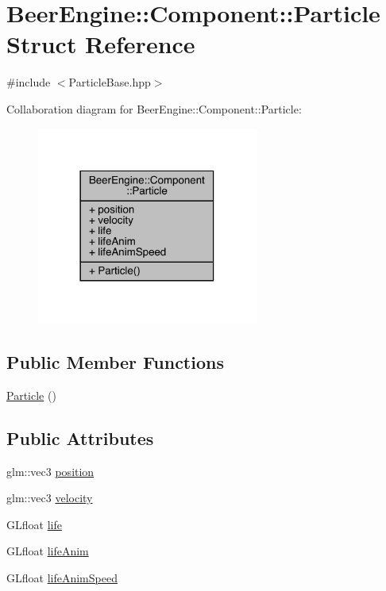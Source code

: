 \hypertarget{struct_beer_engine_1_1_component_1_1_particle}{}\section{Beer\+Engine\+:\+:Component\+:\+:Particle Struct Reference}
\label{struct_beer_engine_1_1_component_1_1_particle}


{\ttfamily \#include $<$Particle\+Base.\+hpp$>$}



Collaboration diagram for Beer\+Engine\+:\+:Component\+:\+:Particle\+:\nopagebreak
\begin{figure}[H]
\begin{center}
\leavevmode
\includegraphics[width=206pt]{struct_beer_engine_1_1_component_1_1_particle__coll__graph}
\end{center}
\end{figure}
\subsection*{Public Member Functions}
\begin{DoxyCompactItemize}
\item 
\mbox{\hyperlink{struct_beer_engine_1_1_component_1_1_particle_a5cda26648ed47e1ef726a07437ac8530}{Particle}} ()
\end{DoxyCompactItemize}
\subsection*{Public Attributes}
\begin{DoxyCompactItemize}
\item 
glm\+::vec3 \mbox{\hyperlink{struct_beer_engine_1_1_component_1_1_particle_a23d67ee03aeae7d36af443d4a5073fc9}{position}}
\item 
glm\+::vec3 \mbox{\hyperlink{struct_beer_engine_1_1_component_1_1_particle_ac9197940d7cd2b4b34fb031b81f7b766}{velocity}}
\item 
G\+Lfloat \mbox{\hyperlink{struct_beer_engine_1_1_component_1_1_particle_a34f41da652f2fd8e050b53b4cb6fc48c}{life}}
\item 
G\+Lfloat \mbox{\hyperlink{struct_beer_engine_1_1_component_1_1_particle_aa253bdeacf5354979f7ebf0a3d57e5ee}{life\+Anim}}
\item 
G\+Lfloat \mbox{\hyperlink{struct_beer_engine_1_1_component_1_1_particle_a84eaed620a72fd7c09f5ca4e97d5e96e}{life\+Anim\+Speed}}
\end{DoxyCompactItemize}



